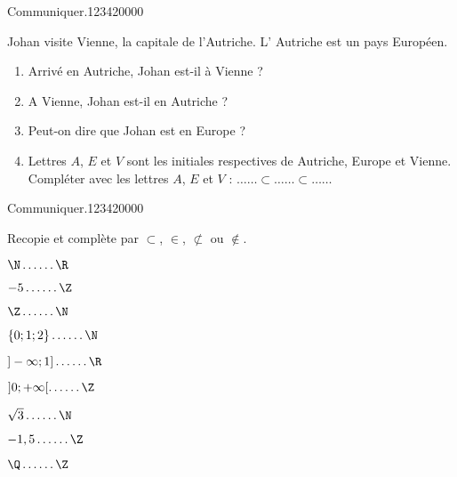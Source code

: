   
\begin{pageParcoursu}

\begin{ExoCu}{Communiquer.}{1234}{2}{0}{0}{0}{0}

Johan visite Vienne, la capitale de l'Autriche. L' Autriche est un pays Européen.
\begin{enumerate}[leftmargin=*]
\item Arrivé en Autriche, Johan est-il à Vienne ? 
\item A Vienne, Johan est-il en Autriche ?
\item Peut-on dire que Johan est en Europe ?
\item Lettres $A$, $E$ et $V$ sont les initiales respectives de Autriche, Europe et Vienne. Compléter avec les lettres $A$, $E$ et $V$ : $\ldots\ldots \subset \ldots\ldots \subset \ldots\ldots $
\end{enumerate}


\end{ExoCu}


\begin{ExoCu}{Communiquer.}{1234}{2}{0}{0}{0}{0}

Recopie et complète par $\subset$, $\in$, $\not\subset$ ou $\notin$.

\begin{enumerate}
\begin{minipage}{0.32\linewidth}
\item $\N \ldots \ldots \R$
\item $-5 \ldots \ldots \Z$
\item $\Z \ldots \ldots \N$
\end{minipage}
\hfill
\begin{minipage}{0.32\linewidth}
\item $\left\lbrace 0;1;2 \right\rbrace \ldots \ldots \N$
\item $]-\infty;1] \ldots \ldots \R$
\item $]0;+\infty[ \ldots \ldots \Z$
\end{minipage}
\hfill
\begin{minipage}{0.32\linewidth}
\item $\sqrt{3} \ldots \ldots \N$
\item $-1,5 \ldots \ldots \Z$
\item $\Q \ldots \ldots \Z$
\end{minipage}
\end{enumerate}
 

\end{ExoCu}
\end{pageParcoursu}
